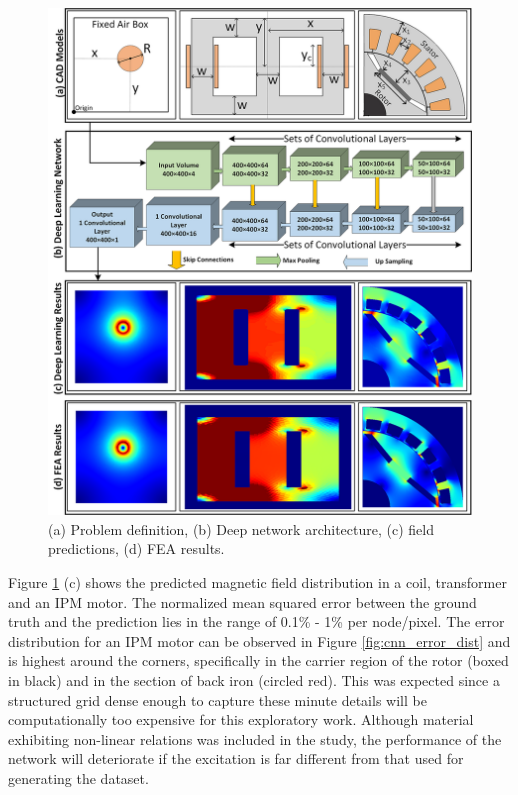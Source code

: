 \begin{figure}[h!]
    \centering
    \includegraphics[width=\textwidth]{Figures/Chp2_CNN/NNArch_Results.png}
    \caption{(a) Problem definition, (b) Deep network architecture, (c) field predictions, (d) FEA results.}
    \label{fig:cnn_nnarch_results}
\end{figure}

Figure \ref{fig:cnn_nnarch_results} (c) shows the predicted magnetic field distribution in a coil, transformer and an IPM motor. The normalized mean squared error between the ground truth and the prediction lies in the range of 0.1\% - 1\% per node/pixel. The error distribution for an IPM motor can be observed in Figure \ref{fig:cnn_error_dist} and is highest around the corners, specifically in the carrier region of the rotor (boxed in black) and in the section of back iron (circled red). This was expected since a structured grid dense enough to capture these minute details will be computationally too expensive for this exploratory work. Although material exhibiting non-linear relations was included in the study, the performance of the network will deteriorate if the excitation is far different from that used for generating the dataset. 

